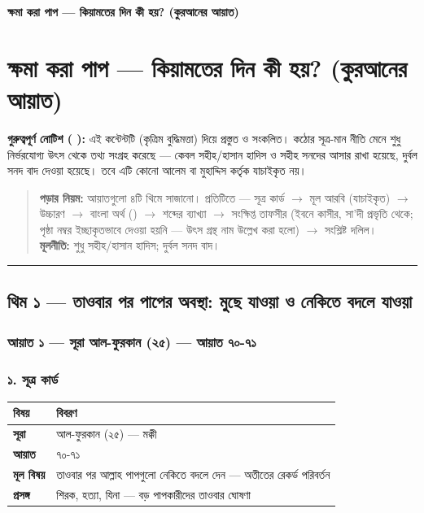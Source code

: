 

\begin{center}{\Large\bfseries\color{emerald} ক্ষমা করা পাপ — কিয়ামতের দিন কী হয়? (কুরআনের আয়াত)}\end{center}
\vspace{1em}
\section*{ক্ষমা করা পাপ — কিয়ামতের দিন কী হয়? (কুরআনের আয়াত)}

\begin{warnbox}
 \textbf{গুরুত্বপূর্ণ নোটিশ ( ):} এই কন্টেন্টটি  (কৃত্রিম বুদ্ধিমত্তা) দিয়ে প্রস্তুত ও সংকলিত।  কঠোর সূত্র-মান নীতি মেনে শুধু নির্ভরযোগ্য উৎস থেকে তথ্য সংগ্রহ করেছে — কেবল সহীহ/হাসান হাদিস ও সহীহ সনদের আসার রাখা হয়েছে, দুর্বল সনদ বাদ দেওয়া হয়েছে। তবে এটি কোনো আলেম বা মুহাদ্দিস কর্তৃক যাচাইকৃত নয়।
\end{warnbox}

\begin{quote}
\textbf{পড়ার নিয়ম:} আয়াতগুলো ৪টি থিমে সাজানো। প্রতিটিতে — সূত্র কার্ড $\rightarrow$ মূল আরবি (যাচাইকৃত) $\rightarrow$ উচ্চারণ $\rightarrow$ বাংলা অর্থ () $\rightarrow$ শব্দের ব্যাখ্যা $\rightarrow$ সংক্ষিপ্ত তাফসীর (ইবনে কাসীর, সা'দী প্রভৃতি থেকে; পৃষ্ঠা নম্বর ইচ্ছাকৃতভাবে দেওয়া হয়নি — উৎস গ্রন্থ নাম উল্লেখ করা হলো) $\rightarrow$ সংশ্লিষ্ট দলিল। \\
\textbf{মূলনীতি:} শুধু সহীহ/হাসান হাদিস; দুর্বল সনদ বাদ।
\end{quote}

\medskip\hrule\medskip

\subsection*{থিম ১ — তাওবার পর পাপের অবস্থা: মুছে যাওয়া ও নেকিতে বদলে যাওয়া}

\subsubsection*{আয়াত ১ — সূরা আল-ফুরকান (২৫) — আয়াত ৭০-৭১}

\subsubsection*{১. সূত্র কার্ড}

\begin{table}[h]\centering\small
\begin{tabular}{ll}
বিষয় & বিবরণ \\
\hline
\textbf{সূরা} & আল-ফুরকান (২৫) — মক্কী \\
\textbf{আয়াত} & ৭০-৭১ \\
\textbf{মূল বিষয়} & তাওবার পর আল্লাহ পাপগুলো নেকিতে বদলে দেন — অতীতের রেকর্ড পরিবর্তন \\
\textbf{প্রসঙ্গ} & শিরক, হত্যা, যিনা — বড় পাপকারীদের তাওবার ঘোষণা \\
\hline
\end{tabular}
\end{table}

